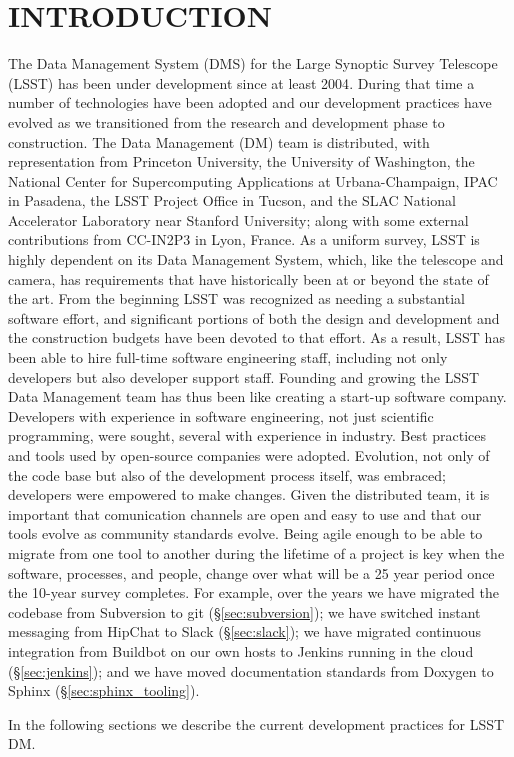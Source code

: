 \section{INTRODUCTION}

The Data Management System (DMS)\cite{2015arXiv151207914J} for the Large Synoptic Survey Telescope (LSST) \cite{2008arXiv0805.2366I} has been under development since at least 2004\cite{2004AAS...20510811A}.
During that time a number of technologies have been adopted and our development practices have evolved as we transitioned from the research and development phase to construction.
The Data Management (DM) team is distributed, with representation from Princeton University, the University of Washington, the National Center for Supercomputing Applications at Urbana-Champaign, IPAC in Pasadena, the LSST Project Office in Tucson, and the SLAC National Accelerator Laboratory near Stanford University; along with some external contributions from CC-IN2P3 in Lyon, France.
As a uniform survey, LSST is highly dependent on its Data Management System, which, like the telescope and camera, has requirements that have historically been at or beyond the state of the art.
From the beginning LSST was recognized as needing a substantial software effort, and significant portions of both the design and development and the construction budgets have been devoted to that effort.
As a result, LSST has been able to hire full-time software engineering staff, including not only developers but also developer support staff.
Founding and growing the LSST Data Management team has thus been like creating a start-up software company.
Developers with experience in software engineering, not just scientific programming, were sought, several with experience in industry.
Best practices and tools used by open-source companies were adopted.
Evolution, not only of the code base but also of the development process itself, was embraced; developers were empowered to make changes.
Given the distributed team, it is important that comunication channels are open and easy to use and that our tools evolve as community standards evolve.
Being agile enough to be able to migrate from one tool to another during the lifetime of a project is key when the software, processes, and people, change over what will be a 25 year period once the 10-year survey completes.
For example, over the years we have migrated the codebase from Subversion to git (\S\ref{sec:subversion}); we have switched instant messaging from HipChat to Slack (\S\ref{sec:slack}); we have migrated continuous integration from Buildbot on our own hosts to Jenkins running in the cloud (\S\ref{sec:jenkins}); and we have moved documentation standards from Doxygen to Sphinx (\S\ref{sec:sphinx_tooling}).

In the following sections we describe the current development practices for LSST DM.
